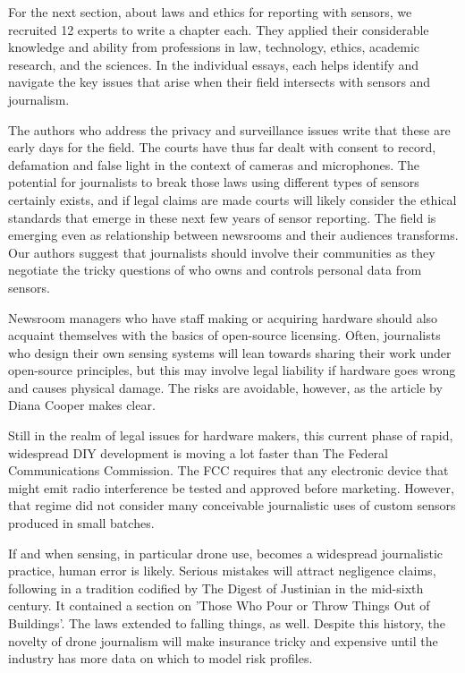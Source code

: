 For the next section, about laws and ethics for reporting with sensors, we
recruited 12 experts to write a chapter each. They applied their considerable
knowledge and ability from professions in law, technology, ethics, academic
research, and the sciences. In the individual essays, each helps identify and
navigate the key issues that arise when their field intersects with sensors
and journalism.

The authors who address the privacy and surveillance issues write that
these are early days for the field. The courts have thus far dealt with consent
to record, defamation and false light in the context of cameras and
microphones. The potential for journalists to break those laws using different
types of sensors certainly exists, and if legal claims are made courts will likely consider the ethical standards that emerge in these next few years of
sensor reporting. The field is emerging even as relationship between newsrooms
and their audiences transforms. Our authors suggest that journalists
should involve their communities as they negotiate the tricky questions of
who owns and controls personal data from sensors.

Newsroom managers who have staff making or acquiring hardware should
also acquaint themselves with the basics of open-source licensing. Often,
journalists who design their own sensing systems will lean towards sharing
their work under open-source principles, but this may involve legal liability
if hardware goes wrong and causes physical damage. The risks are avoidable,
however, as the article by Diana Cooper makes clear.

Still in the realm of legal issues for hardware makers, this current phase of
rapid, widespread DIY development is moving a lot faster than The Federal
Communications Commission. The FCC requires that any electronic device
that might emit radio interference be tested and approved before marketing.
However, that regime did not consider many conceivable journalistic
uses of custom sensors produced in small batches.

If and when sensing, in particular drone use, becomes a widespread journalistic
practice, human error is likely. Serious mistakes will attract negligence
claims, following in a tradition codified by The Digest of Justinian in
the mid-sixth century. It contained a section on 'Those Who Pour or Throw
Things Out of Buildings'. The laws extended to falling things, as well. Despite
this history, the novelty of drone journalism will make insurance tricky and
expensive until the industry has more data on which to model risk profiles.


